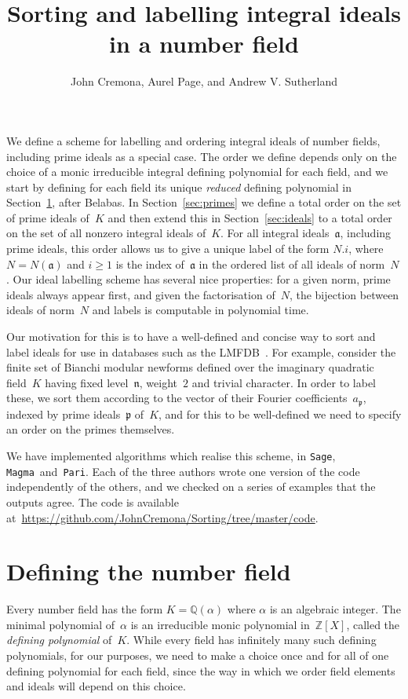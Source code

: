 \documentclass{article}
\title{Sorting and labelling integral ideals in a number field}
\author{John Cremona, Aurel Page, and Andrew V. Sutherland}
\def\Sage{{\tt Sage}}
\def\Magma{{\tt Magma}}
\def\Pari{{\tt Pari}}
\def\Z{{\mathbb Z}}
\def\Q{{\mathbb Q}}
\def\a{{\mathfrak a}}
\def\p{{\mathfrak p}}
\def\n{{\mathfrak n}}
\begin{document}
\maketitle

We define a scheme for labelling and ordering integral ideals of
number fields, including prime ideals as a special case.  The order we
define depends only on the choice of a monic irreducible integral
defining polynomial for each field, and we start by defining for each
field its unique \emph{reduced} defining polynomial in
Section~\ref{sec:polredabs}, after Belabas.  In
Section~\ref{sec:primes} we define a total order on the set of prime
ideals of~$K$ and then extend this in Section~\ref{sec:ideals} to a
total order on the set of all nonzero integral ideals of~$K$.  For all
integral ideals~$\a$, including prime ideals, this order allows us to
give a unique label of the form $N.i$, where~$N=N(\a)$ and $i\ge1$ is
the index of~$\a$ in the ordered list of all ideals of norm~$N$.  Our
ideal labelling scheme has several nice properties: for a given norm,
prime ideals always appear first, and given the factorisation of~$N$,
the bijection between ideals of norm~$N$ and labels is computable in
polynomial time.

Our motivation for this is to have a well-defined and concise way to
sort and label ideals for use in databases such as the
LMFDB~\cite{lmfdb}.  For example, consider the finite set of Bianchi
modular newforms defined over the imaginary quadratic field~$K$ having
fixed level~$\n$, weight~$2$ and trivial character.  In order to label
these, we sort them according to the vector of their Fourier
coefficients~$a_{\p}$, indexed by prime ideals~$\p$ of~$K$, and for
this to be well-defined we need to specify an order on the primes
themselves.

We have implemented algorithms which realise this scheme, in \Sage,
\Magma\ and~\Pari. Each of the three authors wrote one version of the code
independently of the others, and we checked on a series of examples that the
outputs agree. The code is available
at~\url{https://github.com/JohnCremona/Sorting/tree/master/code}.

\section{Defining the number field}
\label{sec:polredabs}
Every number field has the form $K=\Q(\alpha)$ where $\alpha$ is an
algebraic integer.  The minimal polynomial of~$\alpha$ is an
irreducible monic polynomial in~$\Z[X]$, called the \emph{defining
  polynomial} of~$K$.  While every field has infinitely many such
defining polynomials, for our purposes, we need to make a choice once
and for all of one defining polynomial for each field, since the way
in which we order field elements and ideals will depend on this
choice.
\end{document}
